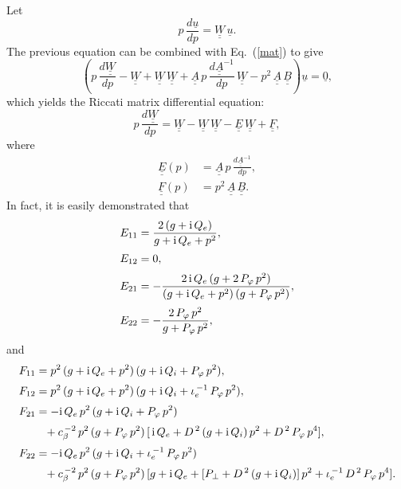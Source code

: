 \documentclass[12pt,prb,aps]{revtex4-1}
\begin{document}
Let
\begin{equation}\label{wdef}
 p\,\frac{d\underline{u}}{dp}=\underline{\underline{W}}\,\underline{u}.
\end{equation}
The previous equation can be combined with Eq.~(\ref{mat}) to give 
\begin{equation}
\left(p\,\frac{d\underline{\underline{W}}}{dp} - \underline{\underline{W}} 
+ \underline{\underline{W}}\,\underline{\underline{W}} + \underline{\underline{A}}\,p\,\frac{d\underline{\underline{A}}^{-1}}{dp}\,\underline{\underline{W}}- p^2\,\underline{\underline{A}}\,\underline{\underline{B}}\right)\underline{u} = \underline{0},
\end{equation}
which  yields the Riccati matrix differential equation:  
\begin{equation}\label{ricc}
p\,\frac{d\underline{\underline{W}}}{dp} = \underline{\underline{W}} - \underline{\underline{W}}\,\underline{\underline{W}} - \underline{\underline{E}}\,\underline{\underline{W}}
+\underline{\underline{F}},
\end{equation}
where 
\begin{align}
\underline{\underline{E}}(p) &= 
\underline{\underline{A}}\,p\,\frac{d\underline{\underline{A}}^{-1}}{dp},\\[0.5ex]
\underline{\underline{F}}(p)&= p^2\,\underline{\underline{A}}\,\underline{\underline{B}}.
\end{align}
In fact, it is easily demonstrated that
\begin{align}\label{ee1}
E_{11} &= \frac{2\,(g+{\rm i}\,Q_e)}{g+ {\rm i}\,Q_e+p^2},\\[0.5ex]
E_{12}&= 0,\\[0.5ex]
E_{21} &=-\frac{2\,{\rm i}\,Q_e\,(g+2\,P_\varphi\,p^2)}{(g+{\rm i}\,Q_e+p^2)\,(g+P_\varphi\,p^2)},\\[0.5ex]
E_{22} &= -\frac{2\,P_\varphi\,p^2}{g+ P_\varphi\,p^2},\label{ee4}
\end{align}
and
\begin{align}\label{f1}
F_{11} &= p^2\,(g+{\rm i}\,Q_e+p^2)\,(g+{\rm i}\,Q_i + P_\varphi\,p^2),\\[0.5ex]
F_{12} &= p^2\,(g+{\rm i}\,Q_e+p^2)\,(g+{\rm i}\,Q_i + \iota_e^{\,-1}\,P_\varphi\,p^2),\\[0.5ex]
F_{21} &=-{\rm i}\,Q_e\,p^2\,(g+{\rm i}\,Q_i+P_\varphi\,p^2)\nonumber\\[0.5ex]
&\phantom{=} + c_\beta^{\,-2}\,p^2\,(g+P_\varphi\,p^2)\,[\,{\rm i}\,Q_e+ D^{\,2}\,(g+{\rm i}\,Q_i)\,p^2 + D^{\,2}\,P_\varphi\,p^4],\\[0.5ex]
F_{22} &=-{\rm i}\,Q_e\,p^2\,(g+{\rm i}\,Q_i+\iota_e^{\,-1}\,P_\varphi\,p^2)\nonumber\\[0.5ex] 
&\phantom{=}+c_\beta^{\,-2}\,p^2\,(g+P_\varphi\,p^2)\,[g+{\rm i}\,Q_e + [P_\perp +D^{\,2}\,(g + {\rm i}\,Q_i)]\,p^2 + \iota_e^{\,-1}\,D^{\,2}\,P_\varphi\,p^4].\label{f4}
\end{align}
\end{document}
